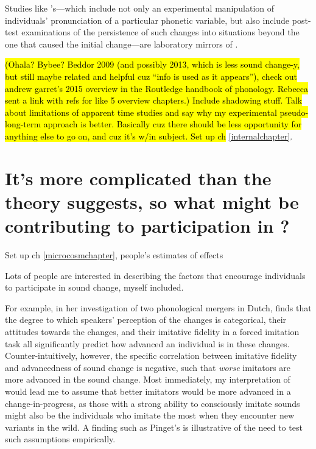     Studies like \citeauthor{delvaux2007influence}'s---which include not only an experimental manipulation of individuals' pronunciation of a particular phonetic variable, but also include post-test examinations of the persistence of such changes into situations beyond the one that caused the initial change---are laboratory mirrors of \lta{} \IRL{}. 
    
    \cite{delvaux2007influence,nielsen2008word,pinget2015actuation,}\hl{(Ohala? Bybee? Beddor 2009 (and possibly 2013, which is less sound change-y, but still maybe related and helpful cuz ``info is used as it appears''), check out andrew garret's 2015 overview in the Routledge handbook of phonology. Rebecca sent a link with refs for like 5 overview chapters.) Include shadowing stuff. Talk about limitations of apparent time studies and say why my experimental pseudo-long-term approach is better. Basically cuz there should be less opportunity for anything else to go on, and cuz it's w/in subject. Set up ch }\ref{internalchapter}.

\section{It's more complicated than the theory suggests, so what might be contributing to participation in \lta{}?}
    Set up ch \ref{microcosmchapter}, people's estimates of effects \cite[?]{pinget2015actuation,sonderegger2012phonetic}

    Lots of people are interested in describing the factors that encourage individuals to participate in sound change, myself included.
    
    For example, in her investigation of two phonological mergers in Dutch, \cite{pinget2015actuation} finds that the degree to which speakers' perception of the changes is categorical, their attitudes towards the changes, and their imitative fidelity in a forced imitation task all significantly predict how advanced an individual is in these changes. Counter-intuitively, however, the specific correlation between imitative fidelity and advancedness of sound change is negative, such that \emph{worse} imitators are more advanced in the sound change. Most immediately, my interpretation of \cbat{} would lead me to assume that better imitators would be more advanced in a change-in-progress, as those with a strong ability to consciously imitate sounds might also be the individuals who imitate the most when they encounter new variants in the wild. A finding such as Pinget's is illustrative of the need to test such assumptions empirically.
    
